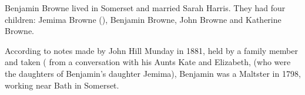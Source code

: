 
Benjamin Browne lived in Somerset and married Sarah Harris.  They had four children: Jemima Browne (), Benjamin Browne, John Browne and Katherine Browne.

According to notes made by John Hill Munday in 1881, held by a family member and taken ( from a conversation with his Aunts Kate and Elizabeth, (who were the daughters of Benjamin's daughter Jemima),  Benjamin was a Maltster in 1798, working near Bath in Somerset.

